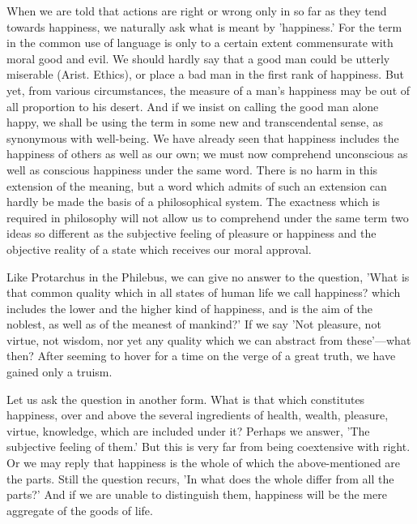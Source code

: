 \documentclass[11pt,letter]{article}
\begin{document}
\par  When we are told that actions are right or wrong only in so far as they tend towards happiness, we naturally ask what is meant by 'happiness.' For the term in the common use of language is only to a certain extent commensurate with moral good and evil. We should hardly say that a good man could be utterly miserable (Arist. Ethics), or place a bad man in the first rank of happiness. But yet, from various circumstances, the measure of a man's happiness may be out of all proportion to his desert. And if we insist on calling the good man alone happy, we shall be using the term in some new and transcendental sense, as synonymous with well-being. We have already seen that happiness includes the happiness of others as well as our own; we must now comprehend unconscious as well as conscious happiness under the same word. There is no harm in this extension of the meaning, but a word which admits of such an extension can hardly be made the basis of a philosophical system. The exactness which is required in philosophy will not allow us to comprehend under the same term two ideas so different as the subjective feeling of pleasure or happiness and the objective reality of a state which receives our moral approval.

\par  Like Protarchus in the Philebus, we can give no answer to the question, 'What is that common quality which in all states of human life we call happiness? which includes the lower and the higher kind of happiness, and is the aim of the noblest, as well as of the meanest of mankind?' If we say 'Not pleasure, not virtue, not wisdom, nor yet any quality which we can abstract from these'—what then? After seeming to hover for a time on the verge of a great truth, we have gained only a truism.

\par  Let us ask the question in another form. What is that which constitutes happiness, over and above the several ingredients of health, wealth, pleasure, virtue, knowledge, which are included under it? Perhaps we answer, 'The subjective feeling of them.' But this is very far from being coextensive with right. Or we may reply that happiness is the whole of which the above-mentioned are the parts. Still the question recurs, 'In what does the whole differ from all the parts?' And if we are unable to distinguish them, happiness will be the mere aggregate of the goods of life.
\end{document}

